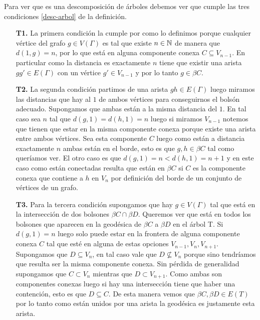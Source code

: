 \documentclass[tesis.tex]{subfiles}
\begin{document}
\begin{ej}
	Para ver que es una descomposición de árboles debemos ver que cumple las tres condiciones \ref{desc-arbol} de la definición. 
	\begin{enumerate}
		\item[\textbf{T1.}] La primera condición la cumple por como lo definimos porque cualquier vértice del grafo $g \in V(\Gamma)$ 
		es tal que existe $n \in \mathbb{N}$ de manera que $d(1,g)=n$, por lo que está en alguna componente conexa $C \subseteq V_{n-1}$. 
		En particular como la distancia es exactamente $n$ tiene que existir una arista $gg' \in E(\Gamma)$ con un vértice $g' \in V_{n-1}$ y por lo tanto $g \in \beta C$.
		
		\item[\textbf{T2.}] La segunda condición partimos de una arista $gh \in E(\Gamma)$ luego miramos las distancias que hay al $1$ de ambos vértices para conseguirnos el bolsón adecuado. 
		Supongamos que ambas están a la misma distancia del $1$. En tal caso sea $n$ tal que $d(g,1)=d(h,1)=n$ luego si miramos $V_{n-1}$ notemos que tienen que estar en la misma componente conexa porque existe una arista entre ambos vértices. Sea esta componente $C$ luego como están a distancia exactamente $n$ ambas están en el borde, esto es que $g,h \in \beta C$ tal como queríamos ver. 
		El otro caso es que $d(g,1)=n < d(h,1)=n+1$ y en este caso como están conectadas resulta que están en $\beta C$ si $C$ es la componente conexa que contiene a $h$ en $V_n$ por definición del borde de un conjunto de vértices de un grafo.
		
		\item[\textbf{T3.}] Para la tercera condición supongamos que hay $g \in V(\Gamma)$ tal que está en la intersección de dos bolsones $\beta C \cap \beta D$. 
		Queremos ver que está en todos los bolsones que aparecen en la geodésica de $\beta C$ a $\beta D$ en el árbol T. 
		Si $d(g,1) = n$ luego solo puede estar en la frontera de alguna componente conexa $C$ tal que esté en alguna de estas opciones  $V_{n-1}, V_{n},  V_{n+1}$. 
		Supongamos que $D \subseteq V_{n}$, en tal caso vale que $D \nsubseteq V_{n}$ porque sino tendríamos que resulta ser la misma componente conexa. 
		Sin pérdida de generalidad supongamos que $C \subset V_n$ mientras que $D \subset V_{n+1}$. 
		Como ambas son componentes conexas luego si hay una intersección tiene que haber una contención, esto es que $D \subseteq C$. 
		De esta manera vemos que $\beta C, \beta D \in E(T)$ por lo tanto como están unidos por una arista la geodésica es justamente esta arista.
		
	\end{enumerate}
\end{ej}
\end{document}
